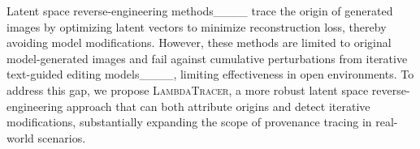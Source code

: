Latent space reverse-engineering methods____ trace the origin of generated images by %
optimizing latent vectors to minimize reconstruction loss, thereby avoiding model modifications. However, these methods are limited to original model-generated images and %
fail against cumulative perturbations from iterative text-guided editing models____, limiting effectiveness in open environments. To address this gap, we propose \textsc{LambdaTracer}, a more robust latent space reverse-engineering approach that can both attribute origins and detect iterative modifications, substantially expanding the scope of provenance tracing in real-world scenarios.